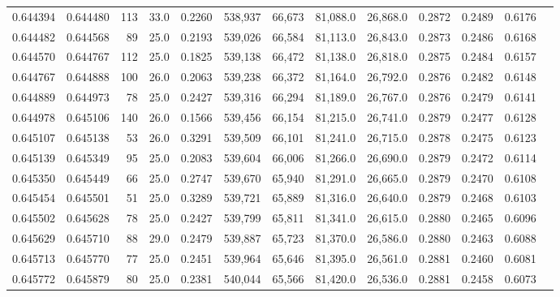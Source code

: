 \begin{tabular}{rrrrrrrrrrrrr}
0.644394 & 0.644480 &   113 & 33.0 &                                     0.2260 & 538,937 &  66,673 &  81,088.0 &  26,868.0 & 0.2872 & 0.2489 & 0.6176 \\
0.644482 & 0.644568 &    89 & 25.0 &                                     0.2193 & 539,026 &  66,584 &  81,113.0 &  26,843.0 & 0.2873 & 0.2486 & 0.6168 \\
0.644570 & 0.644767 &   112 & 25.0 &                                     0.1825 & 539,138 &  66,472 &  81,138.0 &  26,818.0 & 0.2875 & 0.2484 & 0.6157 \\
0.644767 & 0.644888 &   100 & 26.0 &                                     0.2063 & 539,238 &  66,372 &  81,164.0 &  26,792.0 & 0.2876 & 0.2482 & 0.6148 \\
0.644889 & 0.644973 &    78 & 25.0 &                                     0.2427 & 539,316 &  66,294 &  81,189.0 &  26,767.0 & 0.2876 & 0.2479 & 0.6141 \\
0.644978 & 0.645106 &   140 & 26.0 &                                     0.1566 & 539,456 &  66,154 &  81,215.0 &  26,741.0 & 0.2879 & 0.2477 & 0.6128 \\
0.645107 & 0.645138 &    53 & 26.0 &                                     0.3291 & 539,509 &  66,101 &  81,241.0 &  26,715.0 & 0.2878 & 0.2475 & 0.6123 \\
0.645139 & 0.645349 &    95 & 25.0 &                                     0.2083 & 539,604 &  66,006 &  81,266.0 &  26,690.0 & 0.2879 & 0.2472 & 0.6114 \\
0.645350 & 0.645449 &    66 & 25.0 &                                     0.2747 & 539,670 &  65,940 &  81,291.0 &  26,665.0 & 0.2879 & 0.2470 & 0.6108 \\
0.645454 & 0.645501 &    51 & 25.0 &                                     0.3289 & 539,721 &  65,889 &  81,316.0 &  26,640.0 & 0.2879 & 0.2468 & 0.6103 \\
0.645502 & 0.645628 &    78 & 25.0 &                                     0.2427 & 539,799 &  65,811 &  81,341.0 &  26,615.0 & 0.2880 & 0.2465 & 0.6096 \\
0.645629 & 0.645710 &    88 & 29.0 &                                     0.2479 & 539,887 &  65,723 &  81,370.0 &  26,586.0 & 0.2880 & 0.2463 & 0.6088 \\
0.645713 & 0.645770 &    77 & 25.0 &                                     0.2451 & 539,964 &  65,646 &  81,395.0 &  26,561.0 & 0.2881 & 0.2460 & 0.6081 \\
0.645772 & 0.645879 &    80 & 25.0 &                                     0.2381 & 540,044 &  65,566 &  81,420.0 &  26,536.0 & 0.2881 & 0.2458 & 0.6073 \\

\end{tabular}
